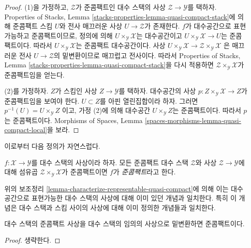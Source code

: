 \begin{proof}
(1)을 가정하고, $\mathcal{Z}$가 준콤팩트인 대수 스택의 사상
$\mathcal{Z} \to \mathcal{Y}$를 택하자. Properties of Stacks, Lemma
\ref{stacks-properties-lemma-quasi-compact-stack}에 의해 준콤팩트 스킴
$U$와 전사 매끄러운 사상 $U \to \mathcal{Z}$가 존재한다.
$f$가 대수공간으로 표현가능하고 준콤팩트이므로, 정의에 의해
$U \times_\mathcal{Y} \mathcal{X}$는 대수공간이고
$U \times_\mathcal{Y} \mathcal{X} \to U$는 준콤팩트이다.
따라서 $U \times_\mathcal{Y} \mathcal{X}$는 준콤팩트 대수공간이다. 사상
$U \times_\mathcal{Y} \mathcal{X} \to
\mathcal{Z} \times_\mathcal{Y} \mathcal{X}$
은 매끄러운 전사 $U \to \mathcal{Z}$의 밑변환이므로 매끄럽고 전사이다.
따라서 Properties of Stacks, Lemma
\ref{stacks-properties-lemma-quasi-compact-stack}을 다시 적용하면
$\mathcal{Z} \times_\mathcal{Y} \mathcal{X}$가 준콤팩트임을 얻는다.

\medskip\noindent
(2)를 가정하자. $Z$가 스킴인 사상 $Z \to \mathcal{Y}$를 택하자.
대수공간의 사상 $p : Z \times_\mathcal{Y} \mathcal{X} \to Z$가
준콤팩트임을 보여야 한다. $U \subset Z$를 아핀 열린집합이라 하자. 그러면
$p^{-1}(U) = U \times_\mathcal{Y} Z$
이고, 가정 (2)에 의해 대수공간 $U \times_\mathcal{Y} Z$는 준콤팩트이다.
따라서 $p$는 준콤팩트이다. Morphisms of Spaces, Lemma
\ref{spaces-morphisms-lemma-quasi-compact-local}을 보라.
\end{proof}

\noindent
이로부터 다음 정의가 자연스럽다.

\begin{definition}
\label{definition-quasi-compact}
$f : \mathcal{X} \to \mathcal{Y}$를 대수 스택의 사상이라 하자.
모든 준콤팩트 대수 스택 $\mathcal{Z}$와 사상
$\mathcal{Z} \to \mathcal{Y}$에 대해 섬유곱
$\mathcal{Z} \times_\mathcal{Y} \mathcal{X}$가 준콤팩트이면
$f$가 {\it 준콤팩트}라고 한다.
\end{definition}

\noindent
위의 보조정리 \ref{lemma-characterize-representable-quasi-compact}에 의해
이는 대수공간으로 표현가능한 대수 스택의 사상에 대해 이미 있던 개념과
일치한다. 특히 이 개념은 대수 스택과 스킴 사이의 사상에 대해 이미
정의한 개념들과 일치한다.

\begin{lemma}
\label{lemma-base-change-quasi-compact}
대수 스택의 준콤팩트 사상을 대수 스택의 임의의 사상으로 밑변환하면
준콤팩트이다.
\end{lemma}

\begin{proof}
생략한다.
\end{proof}

